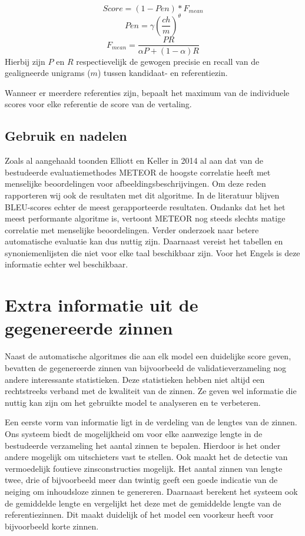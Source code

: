 \begin{equation}
Score = (1 - Pen)*F_{mean}
\end{equation} 
\begin{equation}
Pen = \gamma (\frac{ch}{m})^\theta 
\end{equation}
\begin{equation}
F_{mean} = \frac{PR}{\alpha P + (1- \alpha)R}
\end{equation}
Hierbij zijn $P$ en $R$ respectievelijk de gewogen precisie en recall van de gealigneerde unigrams ($m$) tussen kandidaat- en referentiezin.

Wanneer er meerdere referenties zijn, bepaalt het maximum van de individuele scores voor elke referentie de score van de vertaling.

\subsection{Gebruik en nadelen}
Zoals al aangehaald toonden Elliott en Keller in 2014 al aan dat van de bestudeerde evaluatiemethodes METEOR de hoogste correlatie heeft met menselijke beoordelingen voor afbeeldingsbeschrijvingen. Om deze reden rapporteren wij ook de resultaten met dit algoritme. In de literatuur blijven BLEU-scores echter de meest gerapporteerde resultaten.
Ondanks dat het het meest performante algoritme is, vertoont METEOR nog steeds slechts matige correlatie met menselijke beoordelingen. Verder onderzoek naar betere automatische evaluatie kan dus nuttig zijn. Daarnaast vereist het tabellen en synoniemenlijsten die niet voor elke taal beschikbaar zijn. Voor het Engels is deze informatie echter wel beschikbaar. 


\section{Extra informatie uit de gegenereerde zinnen}
Naast de automatische algoritmes die aan elk model een duidelijke score geven, bevatten de gegenereerde zinnen van bijvoorbeeld de validatieverzameling nog andere interessante statistieken. Deze statistieken hebben niet altijd een rechtstreeks verband met de kwaliteit van de zinnen. Ze geven wel informatie die nuttig kan zijn om het gebruikte model te analyseren en te verbeteren.

Een eerste vorm van informatie ligt in de verdeling van de lengtes van de zinnen. Ons systeem biedt de mogelijkheid om voor elke aanwezige lengte in de bestudeerde verzameling het aantal zinnen te bepalen. Hierdoor is het onder andere mogelijk om uitschieters vast te stellen. Ook maakt het de detectie van vermoedelijk foutieve zinsconstructies mogelijk. Het aantal zinnen van lengte twee, drie of bijvoorbeeld meer dan twintig geeft een goede indicatie van de neiging om inhoudsloze zinnen te genereren. Daarnaast berekent het systeem ook de gemiddelde lengte en vergelijkt het deze met de gemiddelde lengte van de referentiezinnen. Dit maakt duidelijk of het model een voorkeur heeft voor bijvoorbeeld korte zinnen.


